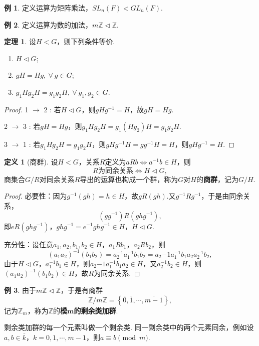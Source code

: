 \documentclass[12pt]{ctexart}
\theoremstyle{definition}
\newtheorem{definition}{定义}
\newtheorem{theorem}{定理}
\newtheorem{example}{例}
\theoremstyle{plain}
\begin{document}
	\begin{example}
		定义运算为矩阵乘法，$SL_n(F)\vartriangleleft GL_n(F)$.
	\end{example}
	\begin{example}
		定义运算为数的加法，$m\mathbb{Z}\vartriangleleft \mathbb{Z}$.
	\end{example}
	\begin{theorem}
		设$H<G$，则下列条件等价.
		\begin{enumerate}
			\item $H\vartriangleleft G$;
			\item $gH=Hg,\ \forall\ g\in G$;
			\item $g_1Hg_2H=g_1g_2H,\ \forall\ g_1,g_2\in G$.
		\end{enumerate}
	\end{theorem}
	\begin{proof}
		1 $\to$ 2 : 若$H\vartriangleleft G$，则$gHg^{-1}=H$，故$gH=Hg$.
		
		2 $\to$ 3 : 若$gH=Hg$，则$g_1Hg_2H=g_1(Hg_2)H=g_1g_2H$.
		
		3 $\to$ 1 : 若$g_1Hg_2H=g_1g_2H$，则$gHg^{-1}H=gg^{-1}H=H$，则$gHg^{-1}=H$.
	\end{proof}
	\begin{definition}[商群]
		设$H<G$，关系$R$定义为$aRb\iff a^{-1}b\in H$，则
		$$R\text{为同余关系}\iff H\vartriangleleft G,$$
		商集合$G/R$对同余关系$R$导出的运算也构成一个群，称为$G$对$H$的\textbf{商群}，记为$G/H$.
	\end{definition}
	\begin{proof}
		必要性：因为$g^{-1}(gh)=h\in H$，故$gR(gh)$.又$g^{-1}Rg^{-1}$，于是由同余关系，$$(gg^{-1})R(ghg^{-1}),$$即$eR(ghg^{-1})$，$ghg^{-1}=e^{-1}ghg^{-1}\in H$，$H\vartriangleleft G$.
		
		充分性：设任意$a_1,a_2,b_1,b_2\in H$，$a_1Rb_1$，$a_2Rb_2$，则
		$$(a_1a_2)^{-1}(b_1b_2)=a_2^{-1}a_1^{-1}b_1b_2=a_2{-1}a_1^{-1}b_1a_2a_2^{-1}b_2,$$
		由于$H\vartriangleleft G$，$a_1^{-1}b_1\in H$，则$a_2{-1}a_1^{-1}b_1a_2\in H$，又$a_2^{-1}b_2\in H$，则$(a_1a_2)^{-1}(b_1b_2)\in H$，故$R$为同余关系.
	\end{proof}
	\begin{example}
		由于$m\mathbb{Z}\vartriangleleft\mathbb{Z}$，于是有商群
		$$\mathbb{Z}/m\mathbb{Z}=\left\{\overline{0},\overline{1},\cdots,\overline{m-1}\right\},$$
		记为$\mathbb{Z}_m$，称为$\mathbb{Z}$的\textbf{模$\boldsymbol{m}$的剩余类加群}.
	\end{example}
	剩余类加群的每一个元素叫做一个剩余类. 同一剩余类中的两个元素同余，例如设$a,b\in\overline{k}$，$k=0,1,\cdots,m-1$，则$a\equiv b\pmod m$. 
\end{document}
